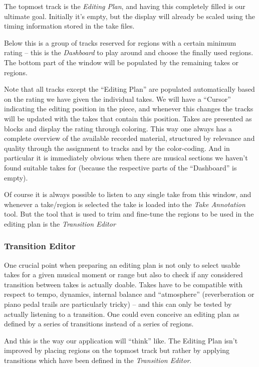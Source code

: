 \documentclass[11pt,a4paper]{article}
\begin{document}
The topmost track is the \emph{Editing Plan}, and having this completely filled
is our ultimate goal.
Initially it's empty, but the display will already be scaled using the timing
information stored in the take files.

Below this is a group of tracks reserved for regions with a certain minimum
rating -- this is the \emph{Dashboard} to play around and choose the finally
used regions.
The bottom part of the window will be populated by the remaining takes or
regions.

Note that all tracks except the “Editing Plan” are populated automatically based
on the rating we have given the individual takes.
We will have a “Cursor” indicating the editing position in the piece, and
whenever this changes the tracks will be updated with the takes that contain
this position.
Takes are presented as blocks and display the rating through coloring.
This way one always has a complete overview of the available recorded material,
structured by relevance and quality through the assignment to tracks and by the
color-coding.
And in particular it is immediately obvious when there are musical sections we
haven't found suitable takes for (because the respective parts of the
“Dashboard” is empty).

Of course it is always possible to listen to any single take from this window,
and whenever a take/region is selected the take is loaded into the \emph{Take
Annotation} tool.
But the tool that is used to trim and fine-tune the regions to be used in the
editing plan is the \emph{Transition Editor}

\subsubsection{Transition Editor}

One crucial point when preparing an editing plan is not only to select usable
takes for a given musical moment or range but also to check if any considered
transition between takes is actually doable.
Takes have to be compatible with respect to tempo, dynamics, internal balance
and “atmosphere” (reverberation or piano pedal trails are particularly tricky)
-- and this can only be tested by actually listening to a transition.
One could even conceive an editing plan as defined by a series of transitions
instead of a series of regions.

And this is the way our application will “think” like.
The Editing Plan isn't improved by placing regions on the topmost track but
rather by applying transitions which have been defined in the \emph{Transition
Editor}.
\end{document}
